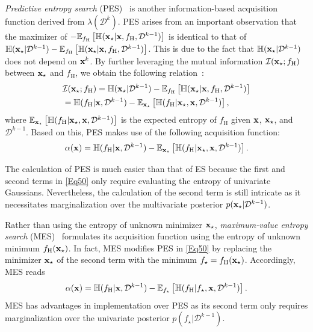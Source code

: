 \documentclass[iicol,sn-basic]{sn-jnl}%
\begin{document}
\textit{Predictive entropy search} (PES)~\citep{HernandezLobato2014} is another information-based acquisition function derived from $\lambda(\mathcal{D}^{k})$.
PES arises from an important observation that the maximizer of $-\mathbb{E}_{f_\text{H}}\left[\mathbb{H}({\bf x}_\star|{\bf x},f_\text{H},\mathcal{D}^{k-1})\right]$ is identical to that of $\mathbb{H}({\bf x}_\star|\mathcal{D}^{k-1})-\mathbb{E}_{f_\text{H}}\left[\mathbb{H}({\bf x}_\star|{\bf x},f_\text{H},\mathcal{D}^{k-1})\right]$.
This is due to the fact that $\mathbb{H}({\bf x}_\star|\mathcal{D}^{k-1})$ does not depend on ${\bf x}^k$.
By further leveraging the mutual information $\mathcal{I}({\bf x}_\star;f_\text{H})$ between ${\bf x}_\star$ and $f_\text{H}$, we obtain the following relation~\citep{Houlsby2012}:
\begin{equation}\label{Eq49}
	\begin{aligned}
		& \mathcal{I}({\bf x}_\star;f_\text{H})
		= \mathbb{H}({\bf x}_\star|\mathcal{D}^{k-1})-\mathbb{E}_{f_\text{H}}\left[\mathbb{H}({\bf x}_\star|{\bf x},f_\text{H},\mathcal{D}^{k-1})\right]\\
		& = \mathbb{H}(f_\text{H}|{\bf x},\mathcal{D}^{k-1})-\mathbb{E}_{{\bf x}_\star}\left[\mathbb{H}(f_\text{H}|{\bf x}_\star,{\bf x},\mathcal{D}^{k-1})\right],
	\end{aligned}
\end{equation}
where $\mathbb{E}_{{\bf x}_\star}\left[\mathbb{H}(f_\text{H}|{\bf x}_\star,{\bf x},\mathcal{D}^{k-1})\right]$ is the expected entropy of $f_\text{H}$ given ${\bf x}$, ${\bf x}_\star$, and $\mathcal{D}^{k-1}$.
Based on this, PES makes use of the following acquisition function:
\begin{equation}\label{Eq50}
		\alpha({\bf x}) 
		= \mathbb{H}(f_\text{H}|{\bf x},\mathcal{D}^{k-1})-\mathbb{E}_{{\bf x}_\star}\left[\mathbb{H}(f_\text{H}|{\bf x}_\star,{\bf x},\mathcal{D}^{k-1})\right].
\end{equation}

The calculation of PES is much easier than that of ES because the first and second terms in \cref{Eq50} only require evaluating the entropy of univariate Gaussians.
Nevertheless, the calculation of the second term is still intricate as it necessitates marginalization over the multivariate posterior $p({\bf x}_\star|\mathcal{D}^{k-1})$.

Rather than using the entropy of unknown minimizer ${\bf x}_\star$, \textit{maximum-value entropy search} (MES)~\citep{WangZ2017} formulates its acquisition function using the entropy of unknown minimum $f_\text{H}({\bf x}_\star)$.
In fact, MES modifies PES in \cref{Eq50} by replacing the minimizer ${\bf x}_\star$ of the second term with the minimum $f_\star = f_\text{H}({\bf x}_\star)$.
Accordingly, MES reads
\begin{equation}\label{Eq51}
	\alpha({\bf x})
	= \mathbb{H}(f_\text{H}|{\bf x},\mathcal{D}^{k-1})-\mathbb{E}_{f_\star }\left[\mathbb{H}(f_\text{H}|f_\star ,{\bf x},\mathcal{D}^{k-1})\right].
\end{equation}
MES has advantages
in implementation over PES as its second term only requires marginalization over the univariate posterior $p(f_\star|\mathcal{D}^{k-1})$.
\end{document}
